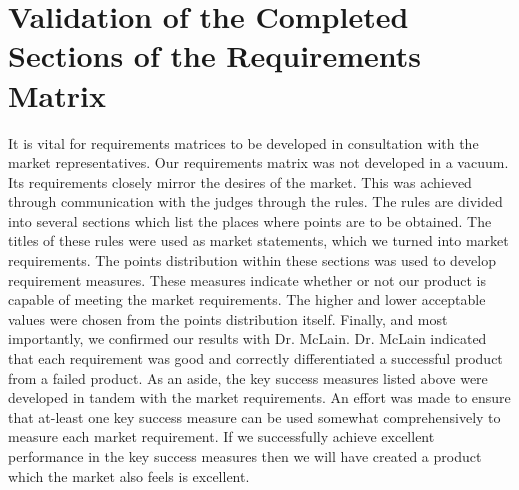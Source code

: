 \documentclass[]{auvsi_doc}
\begin{document}
\section{Validation of the Completed Sections of the Requirements Matrix}
It is vital for requirements matrices to be developed in consultation with the market representatives. Our requirements matrix was not developed in a vacuum. Its requirements closely mirror the desires of the market. This was achieved through communication with the judges through the rules. The rules are divided into several sections which list the places where points are to be obtained. The titles of these rules were used as market statements, which we turned into market requirements. The points distribution within these sections was used to develop requirement measures. These measures indicate whether or not our product is capable of meeting the market requirements. The higher and lower acceptable values were chosen from the points distribution itself. Finally, and most importantly, we confirmed our results with Dr. McLain. Dr. McLain indicated that each requirement was good and correctly differentiated a successful product from a failed product. As an aside, the key success measures listed above were developed in tandem with the market requirements. An effort was made to ensure that at-least one key success measure can be used somewhat comprehensively to measure each market requirement. If we successfully achieve excellent performance in the key success measures then we will have created a product which the market also feels is excellent.
\end{document}
